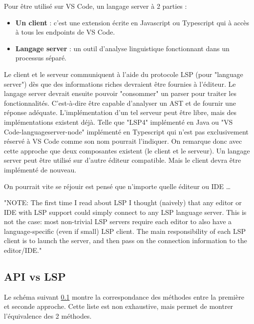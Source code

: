 \documentclass[
    iict, %
    il, %
]{heig-tb}
\begin{document}
Pour être utilisé sur VS Code, un langage server à 2 parties :
\begin{itemize}
    \item \textbf{Un client} : c'est une extension écrite en Javascript ou Typescript qui à accès à tous les endpoints de VS Code.
    \item \textbf{Langage server} : un outil d'analyse linguistique fonctionnant dans un processus séparé.
\end{itemize}

\vspace{\parskip}

Le client et le serveur communiquent à l'aide du protocole LSP (pour "language server") dès que des informations riches devraient être fournies à l'éditeur.
Le langage server devrait ensuite pouvoir "consommer" un parser pour traiter les fonctionnalités. C'est-à-dire être capable d'analyser un AST et de fournir une réponse adéquate.
L'implémentation d'un tel serveur peut être libre, mais des implémentations existent déjà. Telle que "LSP4" implémenté en Java ou  "VS Code-languageserver-node" implémenté en Typescript qui n'est pas exclusivement réservé à VS Code comme son nom pourrait l'indiquer.
On remarque donc avec cette approche que deux composantes existent (le client et le serveur).
Un langage server peut être utilisé sur d'autre éditeur compatible. Mais le client devra être implémenté de nouveau.

On pourrait vite se réjouir est pensé que n'importe quelle éditeur ou IDE \dots

"NOTE: The first time I read about LSP I thought (naively) that any editor or IDE with LSP support could simply connect to any LSP language server. 
This is not the case: most non-trivial LSP servers require each editor to also have a language-specific (even if small) LSP client. 
The main responsibility of each LSP client is to launch the server, and then pass on the connection information to the editor/IDE."


\subsection{API vs LSP}\label{api vs lsp}

Le schéma suivant \ref{api vs lsp} montre la correspondance des méthodes entre la première et seconde approche.
Cette liste est non exhaustive, mais permet de montrer l'équivalence des 2 méthodes.
\end{document}
